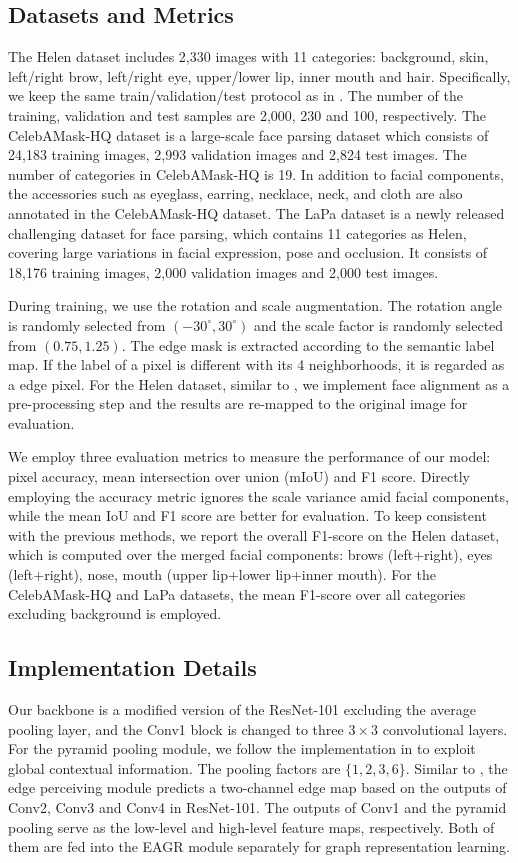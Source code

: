 \documentclass[runningheads]{llncs}
\begin{document}
\subsection{Datasets and Metrics}

The Helen dataset includes 2,330 images with 11 categories: background, skin, left/right brow, left/right eye, upper/lower lip, inner mouth and hair. Specifically, we keep the same train/validation/test protocol as in \cite{le2012interactive}. The number of the training, validation and test samples are 2,000, 230 and 100, respectively.
The CelebAMask-HQ dataset is a large-scale face parsing dataset which consists of 24,183 training images, 2,993 validation images and 2,824 test images.
The number of categories in CelebAMask-HQ is 19. In addition to facial components, the accessories such as eyeglass, earring, necklace, neck, and cloth are also annotated in the CelebAMask-HQ dataset.
The LaPa dataset is a newly released challenging dataset for face parsing, which contains 11 categories as Helen, covering large variations in facial expression, pose and occlusion. It consists of 18,176 training images, 2,000 validation images and 2,000 test images.

During training, we use the rotation and scale augmentation. The rotation angle is randomly selected from $(-30^\circ, 30^\circ)$ and the scale factor is randomly selected from $(0.75, 1.25)$.
The edge mask is extracted according to the semantic label map. If the label of a pixel is different with its 4 neighborhoods, it is regarded as a edge pixel.
For the Helen dataset, similar to \cite{lin2019face}, we implement face alignment as a pre-processing step and the results are re-mapped to the original image for evaluation.

We employ three evaluation metrics to measure the performance of our model: pixel accuracy, mean intersection over union (mIoU) and F1 score.
Directly employing the accuracy metric ignores the scale variance amid facial components, while the mean IoU and F1 score are better for evaluation. 
To keep consistent with the previous methods, we report the overall F1-score on the Helen dataset, which is computed over the merged facial components: brows (left+right), eyes (left+right), nose, mouth (upper lip+lower lip+inner mouth). For the CelebAMask-HQ and LaPa datasets, the mean F1-score over all categories excluding background is employed.
\subsection{Implementation Details}
Our backbone is a modified version of the ResNet-101 \cite{he2016deep} excluding the average pooling layer, and the Conv1 block is changed to three $3 \times 3$ convolutional layers. 
For the pyramid pooling module, we follow the implementation in \cite{zhao2017pyramid} to exploit global contextual information. The pooling factors are $\{1, 2, 3, 6\}$. 
Similar to \cite{ruan2019devil}, the edge perceiving module predicts a two-channel edge map based on the outputs of Conv2, Conv3 and Conv4 in ResNet-101. 
The outputs of Conv1 and the pyramid pooling serve as the low-level and high-level feature maps, respectively. Both of them are fed into the EAGR module separately for graph representation learning. 
\end{document}
